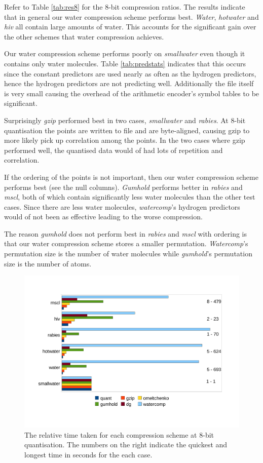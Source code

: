 \documentclass[a4paper]{report}
\begin{document}
Refer to Table \ref{tab:res8} for the $8$-bit compression ratios. The results
indicate that in general our water compression scheme performs
best. \emph{Water}, \emph{hotwater} and \emph{hiv} all contain large amounts
of water. This accounts for the significant gain over the other schemes that
water compression achieves.

Our water compression scheme performs poorly on \emph{smallwater} even though
it contains only water molecules. Table \ref{tab:predstats} indicates that
this occurs since the constant predictors are used nearly as often as the
hydrogen predictors, hence the hydrogen predictors are not predicting well.
Additionally the file itself is very small causing the overhead of the
arithmetic encoder's symbol tables to be significant.

Surprisingly \emph{gzip} performed best in two cases, \emph{smallwater} and
\emph{rabies}. At $8$-bit quantisation the points are written to file and are
byte-aligned, causing gzip to more likely pick up correlation among the
points. In the two cases where gzip performed well, the quantised data would
of had lots of repetition and correlation.

If the ordering of the points is not important, then our water compression
scheme performs best (see the null columns). \emph{Gumhold} performs better in
\emph{rabies} and \emph{mscl}, both of which contain significantly less water
molecules than the other test cases. Since there are less water molecules,
\emph{watercomp}'s hydrogen predictors would of not been as effective leading
to the worse compression.

The reason \emph{gumhold} does not perform best in \emph{rabies} and
\emph{mscl} with ordering is that our water compression scheme stores a
smaller permutation. \emph{Watercomp}'s permutation size is the number of
water molecules while \emph{gumhold}'s permutation size is the number of
atoms.


\begin{figure}[h]
\centering
\includegraphics[trim = 10mm 25mm 10mm 20mm, clip, width=\textwidth]{images/speed8}
\caption{The relative time taken for each compression scheme at $8$-bit
  quantisation. The numbers on the right indicate the quickest and longest
  time in seconds for the each case.}
\label{fig:speed8}
\end{figure}
\end{document}
